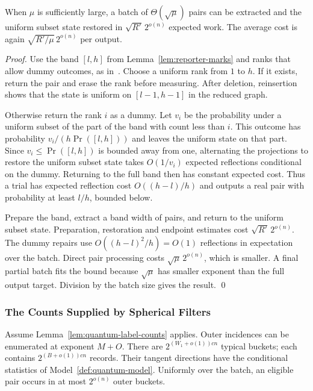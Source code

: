 \documentclass[runningheads,envcountsame,envcountsect,orivec]{llncs}
\begin{document}
\begin{lemma}
\label{lem:reporter-dense}
When $\mu$ is sufficiently large, a batch of
$\Theta(\sqrt\mu)$ pairs can be extracted and the
uniform subset state restored in $\sqrt{R'}\,2^{o(n)}$
expected work. The average cost is again
$\sqrt{R'/\mu}\,2^{o(n)}$ per output.
\end{lemma}

\begin{proof}
Use the band $[l,h]$ from Lemma~\ref{lem:reporter-marks}
and ranks that allow dummy outcomes, as in~\cite[Lemma~7]{BLSS25}.
Choose a uniform rank from $1$ to $h$. If it exists,
return the pair and erase the rank before measuring.
After deletion, reinsertion shows that the state is
uniform on $[l-1,h-1]$ in the reduced graph.

Otherwise return the rank $i$ as a dummy. Let $v_i$ be
the probability under a uniform subset of the part of the band with count
less than $i$. This outcome has probability
$v_i/(h\Pr([l,h]))$ and leaves the uniform state on that
part. Since $v_i\le\Pr([l,h])$ is bounded away from one,
alternating the projections to restore the uniform subset state
takes $O(1/v_i)$ expected reflections conditional on
the dummy. Returning to the full band then has constant
expected cost. Thus a trial has expected reflection
cost $O((h-l)/h)$ and outputs a real pair with
probability at least $l/h$, bounded below.

Prepare the band, extract a band width of pairs, and
return to the uniform subset state. Preparation, restoration and
endpoint estimates cost $\sqrt{R'}\,2^{o(n)}$.
The dummy repairs use $O((h-l)^2/h)=O(1)$ reflections
in expectation over the batch. Direct pair processing
costs $\sqrt\mu\,2^{o(n)}$, which is smaller.
A final partial batch fits the bound because
$\sqrt\mu$ has smaller exponent than the full output
target. Division by the batch size gives the result.
\qed
\end{proof}

\subsubsection{The Counts Supplied by Spherical Filters}

\begin{lemma}
\label{lem:outer-bucket-counts}
Assume Lemma~\ref{lem:quantum-label-counts} applies.
Outer incidences can be enumerated at exponent $M+O$.
There are $2^{(W_1+o(1))cn}$ typical buckets; each contains
$2^{(B+o(1))cn}$ records. Their tangent directions have the
conditional statistics of Model~\ref{def:quantum-model}.
Uniformly over the batch, an eligible pair occurs in at most
$2^{o(n)}$ outer buckets.
\end{lemma}
\end{document}
